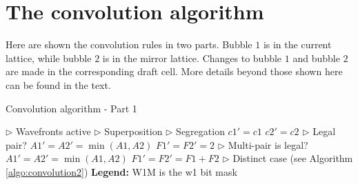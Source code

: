 \documentclass[12pt,english]{article}
\begin{document}
\newpage{}

\section{The convolution algorithm \label{sec:algorithms}}
Here are shown the convolution rules in two parts. Bubble $1$ is in the current lattice, while bubble $2$ is in the mirror lattice. Changes to bubble $1$ and bubble $2$ are made in the corresponding draft cell. More details beyond those shown here can be found in the text.

\begin{algorithm}
    \caption{Convolution algorithm - Part 1}
    \label{algo:convolution1}
    \begin{algorithmic}[1]
            \State $\triangleright$ Wavefronts active 
                \State $\triangleright$ Superposition
                    \State $\triangleright$ Segregation
                        \State $c1'=c1$
                    \EndIf   
                        \State $c2'=c2$
                    \EndIf   
                    \State $\triangleright$ Legal pair?
                        \State $A1'=A2'=\min(A1, A2)$
                        \State $F1'=F2'=2$
                    \EndIf   
                    \State $\triangleright$ Multi-pair is legal?
                        \State $A1'=A2'=\min(A1, A2)$
                        \State $F1'=F2'=F1+F2$
                    \EndIf   
                \EndIf   
            \Else
                \State $\triangleright$ Distinct case
                \State (see Algorithm \ref{algo:convolution2})
            \EndIf   
        \EndIf   
        \State  %
        \State \textbf{Legend:}
        \State W1M is the w1 bit mask

    \end{algorithmic}
\end{algorithm}
\end{document}
